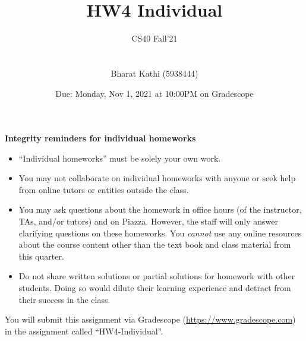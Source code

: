 \documentclass[12pt, oneside]{article}
\title{HW4 Individual}
\author{CS40 Fall'21\\\\\\
Bharat Kathi (5938444)}
\date{Due: Monday, Nov 1, 2021 at 10:00PM on Gradescope}
\begin{document}
\maketitle

{\bf Integrity reminders for individual homeworks}
\begin{itemize}
\item ``Individual homeworks'' must be solely your own work. 
\item You may not collaborate on individual homeworks with anyone or seek help from online tutors or entities outside the class.
\item You may ask questions about the homework in office hours (of the instructor, TAs, and/or tutors) and 
on Piazza.  However, the staff will only answer clarifying questions on these homeworks. You \emph{cannot} use any online resources about the course content other than the text
book and class material from this quarter.
\item Do not share written solutions or partial solutions for homework with other students. Doing so would dilute their learning experience and detract from their success in the class.
\end{itemize}

You will submit this assignment via Gradescope
(\href{https://www.gradescope.com}{https://www.gradescope.com}) in the assignment called ``HW4-Individual''.
\end{document}

